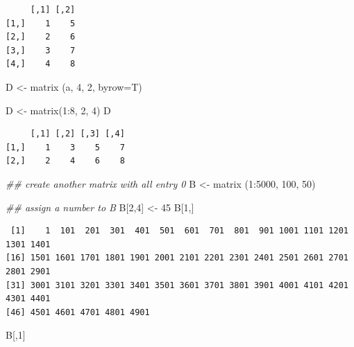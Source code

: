 \documentclass[
  letterpaper,
]{scrbook}
\newenvironment{Shaded}{\begin{snugshade}}{\end{snugshade}}
\newcommand{\AttributeTok}[1]{\textcolor[rgb]{0.40,0.45,0.13}{#1}}
\newcommand{\DecValTok}[1]{\textcolor[rgb]{0.68,0.00,0.00}{#1}}
\newcommand{\DocumentationTok}[1]{\textcolor[rgb]{0.37,0.37,0.37}{\textit{#1}}}
\newcommand{\FunctionTok}[1]{\textcolor[rgb]{0.28,0.35,0.67}{#1}}
\newcommand{\NormalTok}[1]{\textcolor[rgb]{0.00,0.23,0.31}{#1}}
\newcommand{\OtherTok}[1]{\textcolor[rgb]{0.00,0.23,0.31}{#1}}
\newcommand{\SpecialCharTok}[1]{\textcolor[rgb]{0.37,0.37,0.37}{#1}}
\begin{document}
\begin{verbatim}
     [,1] [,2]
[1,]    1    5
[2,]    2    6
[3,]    3    7
[4,]    4    8
\end{verbatim}

\begin{Shaded}
\begin{Highlighting}[]
\NormalTok{D }\OtherTok{\textless{}{-}} \FunctionTok{matrix}\NormalTok{ (a, }\DecValTok{4}\NormalTok{, }\DecValTok{2}\NormalTok{, }\AttributeTok{byrow=}\NormalTok{T)}

\NormalTok{D }\OtherTok{\textless{}{-}} \FunctionTok{matrix}\NormalTok{(}\DecValTok{1}\SpecialCharTok{:}\DecValTok{8}\NormalTok{, }\DecValTok{2}\NormalTok{, }\DecValTok{4}\NormalTok{)}
\NormalTok{D}
\end{Highlighting}
\end{Shaded}

\begin{verbatim}
     [,1] [,2] [,3] [,4]
[1,]    1    3    5    7
[2,]    2    4    6    8
\end{verbatim}

\begin{Shaded}
\begin{Highlighting}[]
\DocumentationTok{\#\# create another matrix with all entry 0}
\NormalTok{B }\OtherTok{\textless{}{-}} \FunctionTok{matrix}\NormalTok{ (}\DecValTok{1}\SpecialCharTok{:}\DecValTok{5000}\NormalTok{, }\DecValTok{100}\NormalTok{, }\DecValTok{50}\NormalTok{)}

\DocumentationTok{\#\# assign a number to B}
\NormalTok{B[}\DecValTok{2}\NormalTok{,}\DecValTok{4}\NormalTok{] }\OtherTok{\textless{}{-}} \DecValTok{45}
\NormalTok{B[}\DecValTok{1}\NormalTok{,]}
\end{Highlighting}
\end{Shaded}

\begin{verbatim}
 [1]    1  101  201  301  401  501  601  701  801  901 1001 1101 1201 1301 1401
[16] 1501 1601 1701 1801 1901 2001 2101 2201 2301 2401 2501 2601 2701 2801 2901
[31] 3001 3101 3201 3301 3401 3501 3601 3701 3801 3901 4001 4101 4201 4301 4401
[46] 4501 4601 4701 4801 4901
\end{verbatim}

\begin{Shaded}
\begin{Highlighting}[]
\NormalTok{B[,}\DecValTok{1}\NormalTok{]}
\end{Highlighting}
\end{Shaded}
\end{document}
